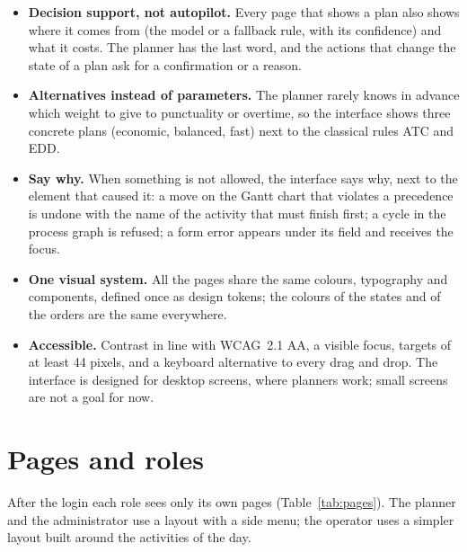 \begin{itemize}
  \item \textbf{Decision support, not autopilot.} Every page that shows a plan also shows where
        it comes from (the model or a fallback rule, with its confidence) and what it costs.
        The planner has the last word, and the actions that change the state of a plan ask for a
        confirmation or a reason.
  \item \textbf{Alternatives instead of parameters.} The planner rarely knows in advance which
        weight to give to punctuality or overtime, so the interface shows three concrete plans
        (economic, balanced, fast) next to the classical rules ATC and EDD.
  \item \textbf{Say why.} When something is not allowed, the interface says why, next to the
        element that caused it: a move on the Gantt chart that violates a precedence is undone
        with the name of the activity that must finish first; a cycle in the process graph is
        refused; a form error appears under its field and receives the focus.
  \item \textbf{One visual system.} All the pages share the same colours, typography and
        components, defined once as design tokens; the colours of the states and of the orders
        are the same everywhere.
  \item \textbf{Accessible.} Contrast in line with WCAG~2.1 AA, a visible focus, targets of at
        least 44 pixels, and a keyboard alternative to every drag and drop. The interface is
        designed for desktop screens, where planners work; small screens are not a goal for now.
\end{itemize}

\section{Pages and roles}
\label{sec:ui-pages}

After the login each role sees only its own pages (Table~\ref{tab:pages}). The planner and the
administrator use a layout with a side menu; the operator uses a simpler layout built around the
activities of the day.

